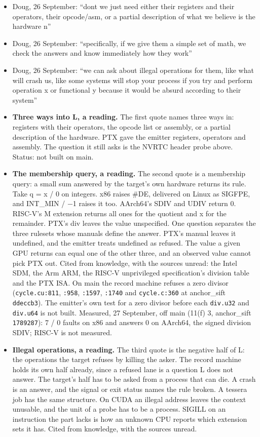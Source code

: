 \begin{enumerate}
\begin{itemize}
\begin{itemize}
\item Doug, 26 September: “dont we just need either their registers and their operators, their opcode/\allowbreak{}asm, or a partial description of what we believe is the hardware n”
\item Doug, 26 September: “specifically, if we give them a simple set of math, we check the answers and know immediately how they work”
\item Doug, 26 September: “we can ask about illegal operations for them, like what will crash us, like some systems will stop your process if you try and perform operation x or functional y because it would be absurd according to their system”
\item \textbf{Three ways into L, a reading.} The first quote names three ways in: registers with their operators, the opcode list or assembly, or a partial description of the hardware. PTX gave the emitter registers, operators and assembly. The question it still asks is the NVRTC header probe above. Status: not built on main.
\item \textbf{The membership query, a reading.} The second quote is a membership query: a small sum answered by the target's own hardware returns its rule. Take q = x / 0 on integers. x86 raises \#DE, delivered on Linux as SIGFPE, and INT\_\allowbreak{}MIN / −1 raises it too. AArch64's SDIV and UDIV return 0. RISC-V's M extension returns all ones for the quotient and x for the remainder. PTX's div leaves the value unspecified. One question separates the three rulesets whose manuals define the answer. PTX's manual leaves it undefined, and the emitter treats undefined as refused. The value a given GPU returns can equal one of the other three, and an observed value cannot pick PTX out. Cited from knowledge, with the sources unread: the Intel SDM, the Arm ARM, the RISC-V unprivileged specification's division table and the PTX ISA. On main the record machine refuses a zero divisor (\texttt{cycle.\allowbreak{}cu:811}, \texttt{:958}, \texttt{:1597}, \texttt{:1740} and \texttt{cycle.\allowbreak{}c:360} at anchor\_\allowbreak{}sift \texttt{ddeccb3}). The emitter's own test for a zero divisor before each \texttt{div.u32} and \texttt{div.u64} is not built. Measured, 27 September, off main (11(f) 3, anchor\_\allowbreak{}sift \texttt{1789287}): 7 / 0 faults on x86 and answers 0 on AArch64, the signed division SDIV; RISC-V is not measured.
\item \textbf{Illegal operations, a reading.} The third quote is the negative half of L: the operations the target refuses by killing the asker. The record machine holds its own half already, since a refused lane is a question L does not answer. The target's half has to be asked from a process that can die. A crash is an answer, and the signal or exit status names the rule broken. A tessera job has the same structure. On CUDA an illegal address leaves the context unusable, and the unit of a probe has to be a process. SIGILL on an instruction the part lacks is how an unknown CPU reports which extension sets it has. Cited from knowledge, with the sources unread.

\end{itemize}
\end{itemize}
\end{enumerate}
